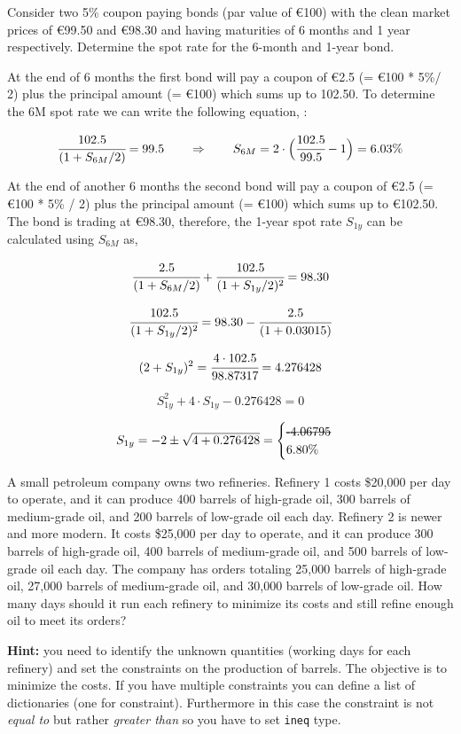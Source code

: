 \begin{question}
Consider two 5\% coupon paying bonds (par value of \euro{100}) with the clean market prices of \euro{99.50} and \euro{98.30} and having maturities of 6 months and 1 year respectively.
Determine the spot rate for the 6-month and 1-year bond.  
\end{question}

\begin{solution}
At the end of 6 months the first bond will pay a coupon of \euro{2.5} (= \euro{100} * 5\%/ 2) plus the principal amount (= €100) which sums up to 102.50. To
determine the 6M spot rate we can write the following equation, :

\[ \cfrac{102.5}{(1 + S_{6M}/2)} = 99.5\qquad\Rightarrow\qquad S_{6M} = 2 \cdot \Big( \cfrac{102.5}{99.5} - 1 \Big) =  6.03 \%\]

At the end of another 6 months the second bond will pay a coupon of €2.5
(= €100 * 5\% / 2) plus the principal amount (= €100) which sums up to
€102.50. The bond is trading at €98.30, therefore, the 1-year spot rate
\(S_{1y}\) can be calculated using \(S_{6M}\) as,

\[ \cfrac{2.5}{(1+S_{6M}/2)} + \cfrac{102.5}{(1 + S_{1y}/2)^{2}} = 98.30 \]

\[ \cfrac{102.5}{(1 + S_{1y}/2)^{2}} = 98.30 - \cfrac{2.5}{(1+0.03015)} \]

\[ (2 + S_{1y})^{2} = \cfrac{4\cdot102.5}{98.87317} = 4.276428 \]

\[ S_{1y}^{2} + 4\cdot S_{1y} - 0.276428 = 0 \]

\[ S_{1y} = -2 \pm \sqrt{4 + 0.276428} =\begin{cases}\text{\sout{-4.06795}} \\ 6.80\%\end{cases} \]

\end{solution}

\begin{question}
A small petroleum company owns two refineries. Refinery 1 costs \$20,000 per day to operate, and it can produce 400 barrels of high-grade oil, 300 barrels of medium-grade oil, and 200 barrels of low-grade oil each day. Refinery 2 is newer and more modern. It costs \$25,000 per day to operate, and it can produce 300 barrels of high-grade oil, 400 barrels of medium-grade oil, and 500 barrels of low-grade oil each day.
The company has orders totaling 25,000 barrels of high-grade oil, 27,000 barrels of medium-grade oil, and 30,000 barrels of low-grade oil. How many days should it run each refinery to minimize its costs and still refine enough oil to meet its orders?

\noindent\textbf{Hint:} you need to identify the unknown quantities (working days for each refinery) and set the constraints on the production of barrels. The objective is to minimize the costs. If you have multiple constraints you can define a list of dictionaries (one for constraint). Furthermore in this case the constraint is not \emph{equal to} but rather \emph{greater than} so you have to set \texttt{ineq} type.
\end{question}

